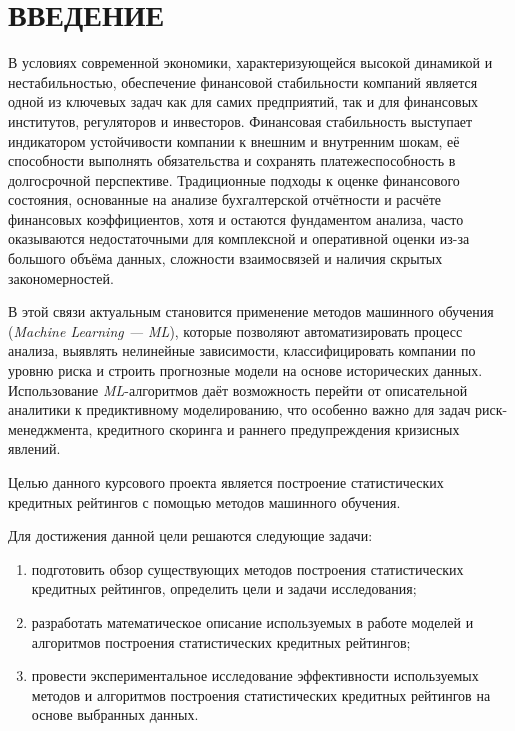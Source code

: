 \documentclass[14pt,a4paper]{extarticle}
\begin{document}
\clearpage
{}
\setcounter{page}{2}

\tableofcontents
\clearpage

\clearpage

\section*{ВВЕДЕНИЕ}

В условиях современной экономики, характеризующейся высокой динамикой 
и нестабильностью, обеспечение финансовой стабильности компаний 
является одной из ключевых задач как для самих предприятий, 
так и для финансовых институтов, регуляторов и инвесторов. 
Финансовая стабильность выступает индикатором устойчивости компании 
к внешним и внутренним шокам, её способности выполнять обязательства 
и сохранять платежеспособность в долгосрочной перспективе. Традиционные 
подходы к оценке финансового состояния, основанные на анализе 
бухгалтерской отчётности и расчёте финансовых коэффициентов, хотя и 
остаются фундаментом анализа, часто оказываются недостаточными для 
комплексной и оперативной оценки из-за большого объёма данных, 
сложности взаимосвязей и наличия скрытых закономерностей.

В этой связи актуальным становится применение методов машинного 
обучения (\textit{Machine Learning --- ML}), которые позволяют 
автоматизировать процесс анализа, выявлять нелинейные зависимости, 
классифицировать компании по уровню риска и строить прогнозные модели 
на основе исторических данных. Использование \textit{ML}-алгоритмов 
даёт возможность перейти от описательной аналитики к предиктивному 
моделированию, что особенно важно для задач риск-менеджмента, 
кредитного скоринга и раннего предупреждения кризисных явлений.

Целью данного курсового проекта является построение статистических 
кредитных рейтингов с помощью методов машинного обучения.

Для достижения данной цели решаются следующие задачи:
\begin{enumerate}
    \item подготовить обзор существующих методов построения статистических кредитных рейтингов, 
    определить цели и задачи исследования;
    \item разработать математическое описание используемых в работе моделей и алгоритмов построения 
    статистических кредитных рейтингов;
    \item провести экспериментальное исследование эффективности используемых методов и алгоритмов 
    построения статистических кредитных рейтингов на основе выбранных данных.
\end{enumerate}
\end{document}
